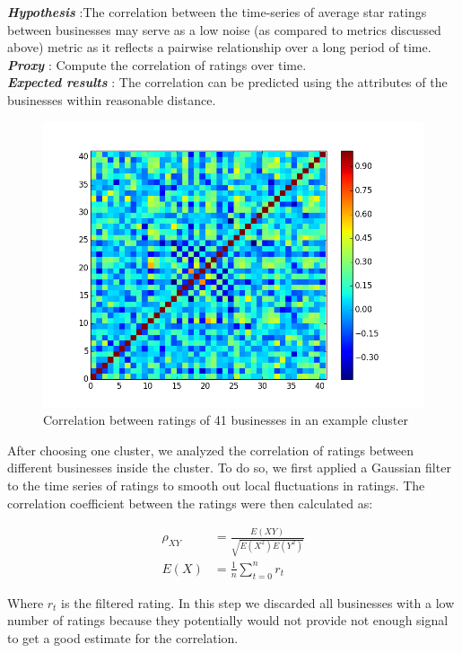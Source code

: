 \documentclass{vldb}
\begin{document}
\textbf{\textit{Hypothesis}} :The correlation between the  time-series of average star ratings between businesses may serve as a low noise (as compared to metrics discussed above) metric as it reflects a pairwise relationship over a long period of time.\\
\textbf{\textit{Proxy}} : Compute the correlation of ratings over time.\\
\textbf{\textit{Expected results}} : The correlation can be predicted using the attributes of the businesses within reasonable distance. 

\begin{figure}
\centering
\includegraphics[width=\columnwidth]{cov_cluster_28}
\caption{Correlation between ratings of 41 businesses in an example cluster}
\label{fig:covmat}
\end{figure}
After choosing one cluster, we analyzed the correlation of ratings between different businesses inside the cluster.
To do so, we first applied a Gaussian filter to the time series of ratings to smooth out local fluctuations in ratings. The correlation coefficient between the ratings were then calculated as:

\begin{align*}
    \rho_{XY} &= \frac{E(XY)}{\sqrt{E(X^2) E(Y^2)}} \\
    E(X) &= \frac{1}{n} \sum_{t = 0}^{n} r_t
\end{align*}

Where $r_t$ is the filtered rating.
In this step we discarded all businesses with a low number of ratings because they potentially would not provide not enough signal to get a good estimate for the correlation.
\end{document}
